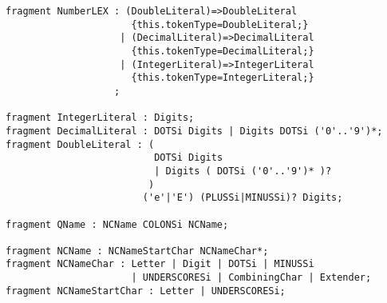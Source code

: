 \begin{Verbatim}[frame=none, fontsize=\footnotesize]
fragment NumberLEX : (DoubleLiteral)=>DoubleLiteral
                      {this.tokenType=DoubleLiteral;}
                    | (DecimalLiteral)=>DecimalLiteral
                      {this.tokenType=DecimalLiteral;}
                    | (IntegerLiteral)=>IntegerLiteral
                      {this.tokenType=IntegerLiteral;}
                   ;
                  
fragment IntegerLiteral : Digits;
fragment DecimalLiteral : DOTSi Digits | Digits DOTSi ('0'..'9')*;
fragment DoubleLiteral : (
                          DOTSi Digits 
                          | Digits ( DOTSi ('0'..'9')* )? 
                         ) 
                        ('e'|'E') (PLUSSi|MINUSSi)? Digits;

fragment QName : NCName COLONSi NCName;

fragment NCName : NCNameStartChar NCNameChar*;
fragment NCNameChar : Letter | Digit | DOTSi | MINUSSi  
                      | UNDERSCORESi | CombiningChar | Extender;
fragment NCNameStartChar : Letter | UNDERSCORESi;



\end{Verbatim}

